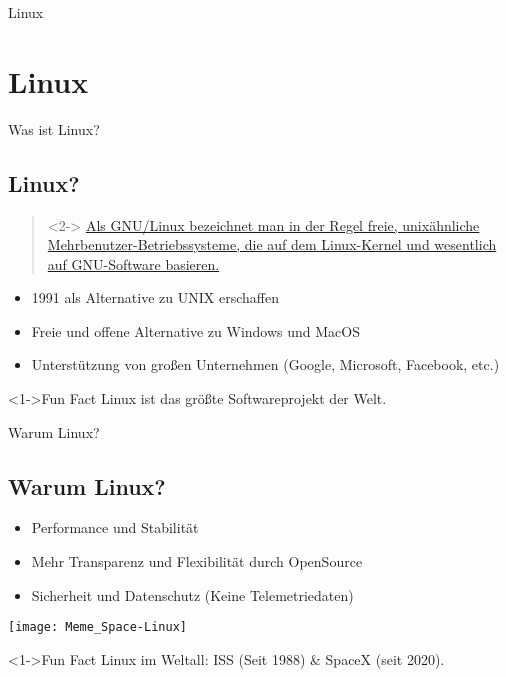 
\begin{frame}{Linux}
    \section{Linux}\label{sec:Linux}
\end{frame}

\begin{frame}{Was ist Linux?}
    \subsection{Linux?}\label{subsec:linux?}

    \begin{quote}<2->
        \href{https://de.wikipedia.org/wiki/Linux}{Als GNU/Linux bezeichnet man in der Regel freie, unixähnliche Mehrbenutzer-Betriebssysteme, die auf dem Linux-Kernel und wesentlich auf GNU-Software basieren.}
    \end{quote}

    \begin{itemize}
        \item<3-> 1991 als Alternative zu UNIX erschaffen
        \item<4-> Freie und offene Alternative zu Windows und MacOS
        \item<5-> Unterstützung von großen Unternehmen (Google, Microsoft, Facebook, etc.)
    \end{itemize}
    \vspace{0.5cm}
    \begin{exampleblock}<1->{Fun Fact}
        Linux ist das größte Softwareprojekt der Welt.
    \end{exampleblock}

\end{frame}

\begin{frame}{Warum Linux?}
    \subsection{Warum Linux?}\label{subsec:warum-linux?}

    \begin{itemize}
        \item<2-> Performance und Stabilität
        \item<3-> Mehr Transparenz und Flexibilität durch OpenSource
        \item<4-> Sicherheit und Datenschutz (Keine Telemetriedaten)
    \end{itemize}
    \vspace{0.5cm}

    \texttt{[image: Meme\_Space-Linux]}
    \begin{exampleblock}<1->{Fun Fact}
        Linux im Weltall: ISS (Seit 1988) \& SpaceX (seit 2020).
    \end{exampleblock}

\end{frame}

